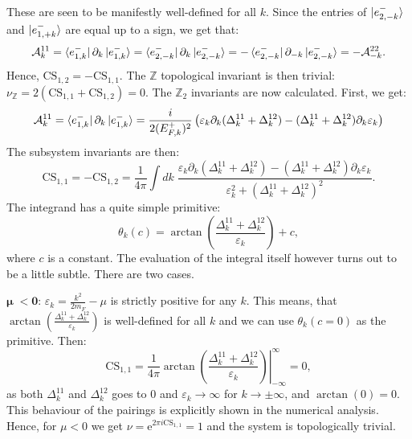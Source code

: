 These are seen to be manifestly well-defined for all $k$. Since the entries of $\ket{e^{-}_{2,-k}}$ and $\ket{e^{-}_{1,+k}}$ are equal up to a sign, we get that:
\begin{equation}
\mathcal{A}^{11}_k = \bra{e^{-}_{1,k}}\partial_k\ket{e^{-}_{1,k}} = \bra{e^{-}_{2,-k}}\partial_k\ket{e^{-}_{2,-k}} = - \bra{e^{-}_{2,-k}}\partial_{-k}\ket{e^{-}_{2,-k}} = -\mathcal{A}^{22}_{-k}. \nonumber
\end{equation}
Hence, $\text{CS}_{1,2} = - \text{CS}_{1,1}$. The $\mathbb{Z}$ topological invariant is then trivial: $\nu_{\mathbb{Z}} = 2(\text{CS}_{1,1} + \text{CS}_{1,2}) = 0$. The $\mathbb{Z}_2$ invariants are now calculated. First, we get:
\begin{equation}
\mathcal{A}^{11}_k = \bra{e^{-}_{1,k}}\partial_k\ket{e^{-}_{1,k}} = \frac{i}{2(E^{+}_{F,k})^2}\left(\varepsilon_k\partial_k(\Delta^{11}_k + \Delta^{12}_k) - (\Delta^{11}_k + \Delta^{12}_k)\partial_k \varepsilon_k\right) \nonumber
\end{equation}
The subsystem invariants are then:
\begin{equation}
\text{CS}_{1,1} = - \text{CS}_{1,2} = \frac{1}{4\pi}\int dk \; \frac{\varepsilon_k\partial_k(\Delta^{11}_k + \Delta^{12}_k) - (\Delta^{11}_k + \Delta^{12}_k)\partial_k \varepsilon_k}{\varepsilon_k^2 + (\Delta^{11}_k + \Delta^{12}_k)^2}.
\label{eq.CS11integralform}
\end{equation}
The integrand has a quite simple primitive:
\begin{equation}
\theta_k(c) = \arctan\left(\frac{\Delta^{11}_k + \Delta^{12}_k }{\varepsilon_k}\right) + c,
\label{eq.thetak.def}
\end{equation}
where $c$ is a constant. The evaluation of the integral itself however turns out to be a little subtle. There are two cases.

$\boldsymbol\mu \;\mathbf{< 0}$: $\varepsilon_k = \frac{k^2}{2m_F} - \mu$ is strictly positive for any $k$. This means, that $\arctan\left(\frac{\Delta^{11}_k + \Delta^{12}_k }{\varepsilon_k}\right)$ is well-defined for all $k$ and we can use $\theta_k(c = 0)$ as the primitive. Then:
\begin{equation}
\text{CS}_{1,1} = \frac{1}{4\pi}\left.\arctan\left(\frac{\Delta^{11}_k + \Delta^{12}_k }{\varepsilon_k}\right)\right|^{\infty}_{-\infty} = 0, \nonumber
\end{equation}
as both $\Delta^{11}_k$ and $\Delta^{12}_k$ goes to $0$ and $\varepsilon_k \to \infty$ for $k\to \pm \infty$, and $\arctan(0) = 0$. This behaviour of the pairings is explicitly shown in the numerical analysis. Hence, for $\mu < 0$ we get $\nu = \text{e}^{2\pi i\text{CS}_{1,1}} = 1$ and the system is topologically trivial. 

